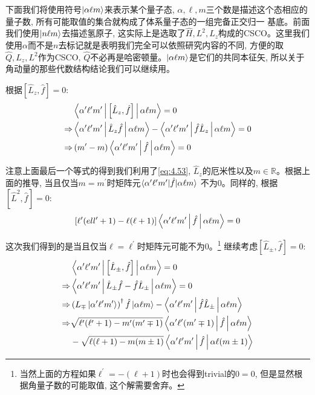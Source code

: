 下面我们将使用符号$\ket{\alpha\ell m}$来表示某个量子态, $\alpha,\ell,m$三个数是描述这个态相应的量子数, 所有可能取值的集合就构成了体系量子态的一组完备正交归一
基底。前面我们使用$\ket{n\ell m}$去描述氢原子, 这实际上是选取了$\hat{H},L^2,L_z$构成的CSCO。这里我们使用$\alpha $而不是$n$去标记就是表明我们完全可以依照研究内容的不同, 方便的取
$\hat{Q},L_z,L^2$作为CSCO, $\hat{Q}$不必再是哈密顿量。$\ket{\alpha\ell m}$是它们的共同本征矢, 所以关于角动量的那些代数结构结论我们可以继续用。

根据$\left[\hat{L}_z,\hat{f}\right]=0$:
\begin{align*}
    &\Braket{\alpha^\prime   \ell^\prime   m^\prime  |\left[\hat{L}_z,\hat{f}\right]|\alpha \ell m}=0\\
    \Rightarrow&\Braket{\alpha^\prime   \ell^\prime   m^\prime  |\hat{L}_z\hat{f}|\alpha \ell m}-\Braket{\alpha^\prime   \ell^\prime   m^\prime  |\hat{f}\hat{L}_z|\alpha \ell m}=0\\
    \Rightarrow&\left(m^\prime-m\right)\Braket{\alpha^\prime   \ell^\prime   m^\prime  |\hat{f}|\alpha \ell m}=0
\end{align*}

注意上面最后一个等式的得到我们利用了\ref{eq:4.53}, $\hat L_z$的厄米性以及$m\in \mathbb{R}$。根据上面的推导, 当且仅当$m=m^\prime$时矩阵元$\braket{\alpha^\prime   \ell^\prime   m^\prime  |\hat{f}|\alpha \ell m}$
不为0。同样的, 根据$\left[\hat{L}^2,\hat{f}\right]=0$:
\begin{equation}
    \left[\ell^\prime(ell^\prime +1)-\ell(\ell+1)\right]\Braket{\alpha^\prime   \ell^\prime   m^\prime  |\hat{f}|\alpha \ell m}=0
\end{equation}

这次我们得到的是当且仅当$\ell=\ell^\prime$时矩阵元可能不为0。\footnote{当然上面的方程如果$\ell^\prime=-(\ell+1)$时也会得到trivial的$0=0$, 但是显然根据角量子数的可能取值, 这个解需要舍弃。}
继续考虑$\left[\hat{L}_\pm,\hat{f}\right]=0$:
\begin{align*}
    &\Braket{\alpha^\prime   \ell^\prime   m^\prime  |\left[\hat{L}_\pm,\hat{f}\right]|\alpha \ell m}=0\\
    \Rightarrow&\Braket{\alpha^\prime   \ell^\prime   m^\prime  |\hat{L}_\pm\hat{f}-\hat{f}\hat{L}_\pm|\alpha \ell m}=0\\
    \Rightarrow&\left(L_\mp\ket{\alpha^\prime   \ell^\prime   m^\prime  }\right)^\dagger\hat{f}\ket{\alpha\ell m}-\Braket{\alpha^\prime   \ell^\prime   m^\prime  |\hat{f}\hat{L}_\pm|\alpha\ell m}\\
    \Rightarrow&\sqrt{\ell^\prime(\ell^\prime+1)-m^\prime(m^\prime\mp 1)}\Braket{\alpha^\prime   \ell^\prime   (m^\prime\mp 1)  |\hat{f}|\alpha \ell m}\\
    &-\sqrt{\ell(\ell+1)-m(m\pm 1)}\Braket{\alpha^\prime   \ell^\prime   m^\prime  |\hat{f}|\alpha \ell (m\pm 1)}
\end{align*}

